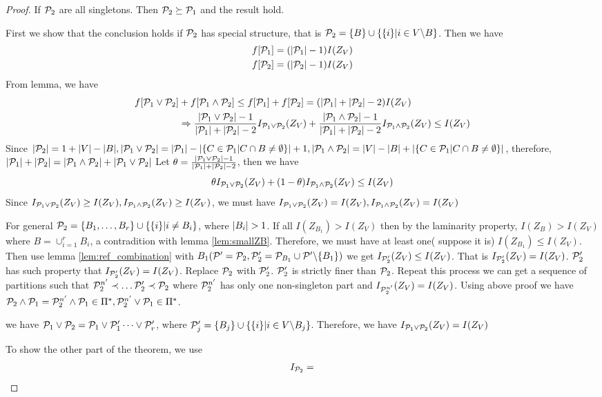 \documentclass{article}
\begin{document}
\begin{proof}
If $\P_2$ are all singletons. Then $\P_2 \succeq \P_1$ and the result hold.

First we show that the conclusion holds if $\P_2$ has special structure, that is $\P_2 = \{B\} \cup \{\{i\}| i\in V\backslash B\}$.  
Then we have 
\begin{align*}
f[\P_1]  & = (\abs{\P_1} - 1) I(Z_V) \\
f[\P_2]  & = (\abs{\P_2} - 1) I(Z_V)
\end{align*}
From lemma, we have 
\begin{align*}
f[\P_1 \vee \P_2] &+ f[\P_1 \wedge \P_2]  \leq f[\P_1] + f[\P_2] = (\abs{\P_1} + \abs{\P_2} - 2) I(Z_V)\\
&\Rightarrow 
\frac{\abs{\P_1 \vee \P_2}-1}{\abs{\P_1} + \abs{\P_2} - 2}I_{\P_1 \vee \P_2}(Z_V)
+ \frac{\abs{\P_1 \wedge \P_2}-1}{\abs{\P_1} + \abs{\P_2} - 2}I_{\P_1 \wedge \P_2}(Z_V)
\leq I(Z_V)
\end{align*}
Since $\abs{\P_2} = 1+ \abs{V} - \abs{B}, \abs{\P_1 \vee \P_2} = \abs{\P_1} - \abs{\{C\in \P_1 | C\cap B \neq \emptyset \}}+1, \abs{\P_1 \wedge \P_2} = \abs{V} - \abs{B} + \abs{\{C\in \P_1 | C\cap B \neq \emptyset \}}$, therefore, $\abs{\P_1} + \abs{\P_2} = \abs{\P_1 \wedge \P_2} + \abs{\P_1 \vee \P_2}$
Let $\theta = \frac{\abs{\P_1 \vee \P_2}-1}{\abs{\P_1} + \abs{\P_2} - 2}$, then we have
\begin{equation*}
\theta I_{\P_1 \vee \P_2}(Z_V)
+ (1-\theta) I_{\P_1 \wedge \P_2}(Z_V)
\leq I(Z_V)
\end{equation*}
Since $I_{\P_1 \vee \P_2}(Z_V) \geq I(Z_V), I_{\P_1 \wedge \P_2}(Z_V) \geq I(Z_V)$,
we must have $I_{\P_1 \vee \P_2}(Z_V) = I(Z_V), I_{\P_1 \wedge \P_2}(Z_V) = I(Z_V)$

For general $\P_2= \{B_1, \dots, B_r\} \cup \{\{i\} |  i\neq B_i\}$,
where $\abs{B_i} > 1$.
If all $I(Z_{B_1})> I(Z_V)$ then by the laminarity property, $I(Z_B) > I(Z_V)$  where $B=\cup_{i=1}^r B_i$, a contradition with lemma \ref{lem:smallZB}. Therefore, we must have at least one( suppose it is)
$I(Z_{B_1}) \leq I(Z_V)$.  Then use lemma \ref{lem:ref_combination} with $B_1(\P
'=\P_2, \P'_2 = \P_{B_1}\cup \P'\backslash\{B_1\})$ we get 
$I_{\P'_2}(Z_V) \leq I(Z_V)$. That is $I_{\P'_2}(Z_V) = I(Z_V)$.
$\P'_2$ has such property that $I_{\P'_2}(Z_V) = I(Z_V)$.
Replace $\P_2$ with $\P'_2$. $\P'_2$ is strictly finer than $\P_2$. Repeat this process we can get
a sequence of partitions such that $\P^{n'}_2 \prec \dots \P'_2 \prec \P_2$ where $\P^{n'}_2$ has only one non-singleton part and $I_{\P^{n'}_2}(Z_V)=I(Z_V)$. Using above proof we have 
$\P_2 \wedge \P_1 = \P^{n'}_2 \wedge \P_1 \in \Pi^*,  \P^{n'}_2 \vee \P_1 \in \Pi^*$.

we have $\P_1 \vee \P_2 = \P_1 \vee \P'_1 \dots \vee \P'_r$,
where $\P'_j =  \{B_j\} \cup \{\{i\}| i\in V\backslash B_j\}$. Therefore, we have $I_{\P_1 \vee \P_2}(Z_V) = I(Z_V)$

To show the other part of the theorem, we use
\begin{align*}
I_{\P_2} = 
\end{align*}

\end{proof}
\end{document}
